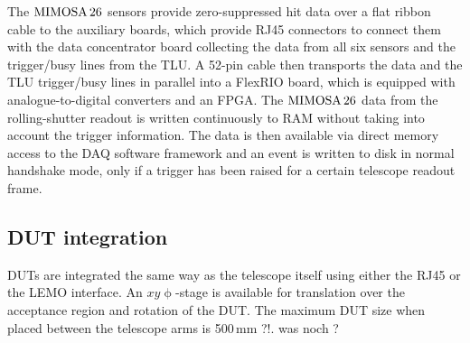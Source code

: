 The $\textrm{MIMOSA\,26}$ sensors provide zero-suppressed hit data over a flat ribbon cable to the auxiliary boards, which provide RJ45 connectors to connect them with the
 data concentrator board collecting the data from all six sensors and the trigger/busy lines from the TLU. 
A 52-pin cable then transports the data and the TLU trigger/busy lines in parallel into a FlexRIO board, which is equipped with analogue-to-digital converters and an FPGA. 
The $\textrm{MIMOSA\,26}$ data from the rolling-shutter readout is written continuously to RAM without taking into account the trigger information. 
The data is then available via direct memory access to the DAQ software framework and an event is written to disk in normal handshake mode, only if a trigger has been raised for a certain telescope readout frame. 

\subsection{DUT integration}

DUTs are integrated the same way as the telescope itself using either the RJ45 or the LEMO interface. 
An $xy\upphi$-stage is available for translation over the acceptance region and rotation of the DUT. 
The maximum DUT size when placed between the telescope arms is 500\,mm ?!.
was noch ?
